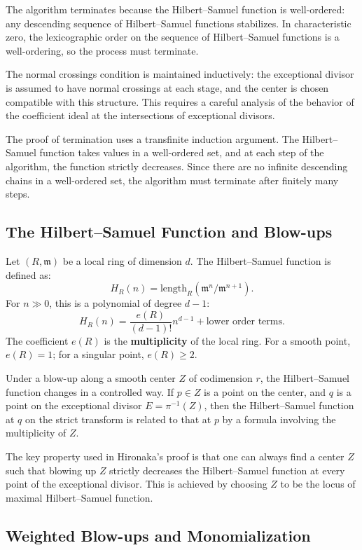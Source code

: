 The algorithm terminates because the Hilbert--Samuel function is well-ordered: any descending sequence of Hilbert--Samuel functions stabilizes. In characteristic zero, the lexicographic order on the sequence of Hilbert--Samuel functions is a well-ordering, so the process must terminate.

The normal crossings condition is maintained inductively: the exceptional divisor is assumed to have normal crossings at each stage, and the center is chosen compatible with this structure. This requires a careful analysis of the behavior of the coefficient ideal at the intersections of exceptional divisors.

The proof of termination uses a transfinite induction argument. The Hilbert--Samuel function takes values in a well-ordered set, and at each step of the algorithm, the function strictly decreases. Since there are no infinite descending chains in a well-ordered set, the algorithm must terminate after finitely many steps.


\subsection*{The Hilbert--Samuel Function and Blow-ups}

Let $(R, \mathfrak{m})$ be a local ring of dimension $d$. The Hilbert--Samuel function is defined as:
\[
H_R(n) = \text{length}_R(\mathfrak{m}^n / \mathfrak{m}^{n+1}).
\]
For $n \gg 0$, this is a polynomial of degree $d-1$:
\[
H_R(n) = \frac{e(R)}{(d-1)!}n^{d-1} + \text{lower order terms}.
\]
The coefficient $e(R)$ is the \textbf{multiplicity} of the local ring. For a smooth point, $e(R) = 1$; for a singular point, $e(R) \geq 2$.

Under a blow-up along a smooth center $Z$ of codimension $r$, the Hilbert--Samuel function changes in a controlled way. If $p \in Z$ is a point on the center, and $q$ is a point on the exceptional divisor $E = \pi^{-1}(Z)$, then the Hilbert--Samuel function at $q$ on the strict transform is related to that at $p$ by a formula involving the multiplicity of $Z$.

The key property used in Hironaka's proof is that one can always find a center $Z$ such that blowing up $Z$ strictly decreases the Hilbert--Samuel function at every point of the exceptional divisor. This is achieved by choosing $Z$ to be the locus of maximal Hilbert--Samuel function.

\subsection*{Weighted Blow-ups and Monomialization}

